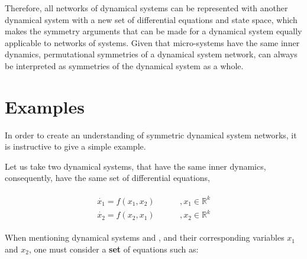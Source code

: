 Therefore, all networks of dynamical systems can be represented with another dynamical system with a new set of differential equations and state space, which makes the symmetry arguments that can be made for a dynamical system equally applicable to networks of systems. Given that micro-systems have the same inner dynamics, permutational symmetries of a dynamical system network, can always be interpreted as symmetries of the dynamical system as a whole.

\section{Examples}

In order to create an understanding of symmetric dynamical system networks, it is instructive to give a simple example.

Let us take two dynamical systems, that have the same inner dynamics, consequently, have the same set of differential equations, 

\begin{align}
\begin{array}{cc}
\dot{x_1}=f(x_1,x_2) &\;\;\;\;\;\;\;\; ,x_1\in\mathbb{R}^k\\
\dot{x_2}=f(x_2,x_1) &\;\;\;\;\;\;\;\; ,x_2\in\mathbb{R}^k
\end{array}
\label{Twocells}
\end{align}

When mentioning dynamical systems  and , and their corresponding variables $ x_1 $ and $ x_2 $, one must consider a \textbf{set} of equations such as:

